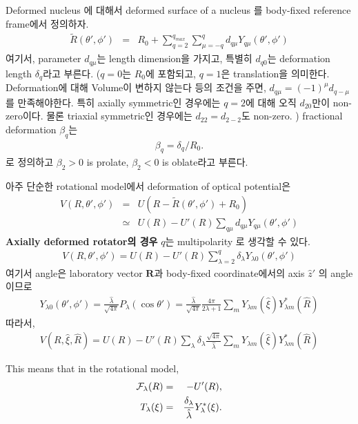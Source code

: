 \documentclass[11pt]{book}
\def\bm{\boldsymbol}
\def\vR{{\bm R}}
\newcommand{\bea}{\begin{eqnarray}}
\newcommand{\eea}{\end{eqnarray}}
\newcommand{\no}{\nonumber \\}
\begin{document}
Deformed nucleus 에 대해서 deformed surface of a nucleus 를 
body-fixed reference frame에서 정의하자. 
\bea 
\tilde{R}(\theta',\phi')
&=&R_0+\sum_{q=2}^{q_{max}} \sum_{\mu=-q}^{q} d_{q\mu} Y_{q\mu}(\theta',\phi')     
\eea 
여기서, parameter $d_{q\mu}$는 length dimension을 가지고, 특별히 
$d_{q0}$는 deformation length $\delta_q$라고 부른다. 
($q=0$는 $R_0$에 포함되고, $q=1$은 translation을 의미한다. Deformation에 대해
Volume이 변하지 않는다 등의 조건을 주면, $d_{q\mu}=(-1)^\mu d_{q-\mu}$를 만족해야한다.
특히 axially symmetric인 경우에는 $q=2$에 대해 오직 $d_{20}$만이 non-zero이다. 
물론 triaxial symmetric인 경우에는 $d_{22}=d_{2-2}$도 non-zero.
) fractional deformation $\beta_q$는 
\bea 
\beta_q=\delta_q/ R_0.
\eea 
로 정의하고 $\beta_2>0$ is prolate, $\beta_2<0$ is oblate라고 부른다.  

아주 단순한 rotational model에서 deformation of optical potential은 
\bea 
V(R,\theta',\phi')&=& U(R-\tilde{R}(\theta',\phi')+R_0)\no 
                  &\simeq& U(R)-U'(R)\sum_{q\mu} d_{q\mu} Y_{q\mu}(\theta',\phi')  
\eea  
{\bf Axially deformed rotator의 경우} $q$는 multipolarity 로 생각할 수 있다.
\bea 
V(R,\theta',\phi')=U(R)-U'(R)\sum_{\lambda=2}^{q}\delta_\lambda Y_{\lambda 0}(\theta',\phi')  
\eea 
여기서 angle은 laboratory vector $\vR$과 body-fixed coordinate에서의 axis $\hat{z}'$
의 angle이므로
\bea 
Y_{\lambda 0}(\theta',\phi')
=\frac{\hat{\lambda} }{\sqrt{4\pi}}P_\lambda(\cos\theta')
=\frac{\hat{\lambda} }{\sqrt{4\pi}}\frac{4\pi}{2\lambda+1}\sum_m 
  Y_{\lambda m}(\hat{\xi}) Y^*_{\lambda m}(\hat{R})
\eea 
따라서,
\bea 
V(R,\hat{\xi},\hat{R})
=U(R)-U'(R)\sum_{\lambda} \delta_\lambda \frac{\sqrt{4\pi}}{\hat{\lambda}}
  \sum_m  Y_{\lambda m}(\hat{\xi}) Y^*_{\lambda m}(\hat{R})
\eea 

This means that in the rotational model,  
\bea 
{\cal F}_\lambda(R)&=&-U'(R),\no 
T_\lambda(\xi) &=& \frac{\delta_\lambda}{\hat{\lambda}} Y_\lambda^*(\xi). 
\eea 
\end{document}
